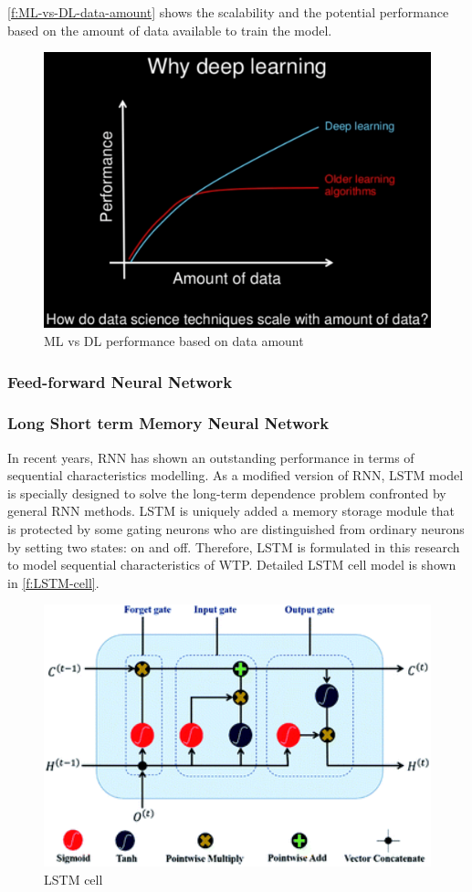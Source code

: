 \autoref{f:ML-vs-DL-data-amount} shows the scalability and the potential performance based on the amount of data available to train the model.
\begin{figure}[h]
\centering
\includegraphics[width=12cm]{figures/Ch2/MlvsDL-data-amount.png}
\caption{ML vs DL performance based on data amount}
\label{f:ML-vs-DL-data-amount}
\end{figure}

\subsubsection{Feed-forward Neural Network}
\subsubsection{Long Short term Memory Neural Network}
In recent years, RNN has shown an outstanding performance in terms of sequential characteristics modelling. As a modified version of RNN, \ac{LSTM} model is specially designed to solve the long-term dependence problem confronted by general RNN methods. LSTM is uniquely added a memory storage module that is protected by some gating neurons who are distinguished from ordinary neurons by setting two states: on and off. Therefore, LSTM is formulated in this research to model sequential characteristics of WTP. Detailed \ac{LSTM} cell model is shown in \autoref{f:LSTM-cell}.

\begin{figure}[h]
\centering
\includegraphics[width=12cm]{figures/Ch2/LSTM_cell.png}
\caption{LSTM cell}
\label{f:LSTM-cell}
\end{figure}

